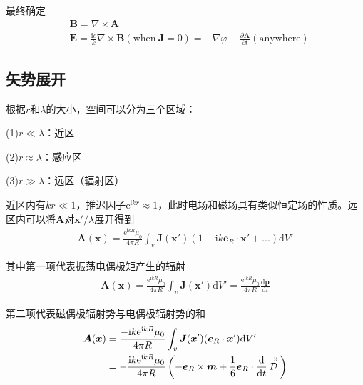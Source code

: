 \documentclass[main.tex]{subfiles}
\begin{document}
最终确定
\begin{align}
    &\boldsymbol{B} = \nabla \times \boldsymbol{A}\\
    &\boldsymbol{E} =  \frac{\mathrm{i}c}{k}\nabla \times \boldsymbol{B} (\mathrm{when}\ \boldsymbol{J} = 0)= -\nabla \varphi - \frac{\partial \boldsymbol{A}}{\partial t}(\mathrm{anywhere})
\end{align}

\subsection{矢势展开}
根据$r$和$\lambda$的大小，空间可以分为三个区域：

(1)$r\ll \lambda$：近区

(2)$r\approx \lambda$：感应区

(3)$r\gg \lambda$：远区（辐射区）

近区内有$kr\ll 1$，推迟因子$\mathrm{e}^{\mathrm{i}kr}\approx 1$，此时电场和磁场具有类似恒定场的性质。远区内可以将$\boldsymbol{A}$对$\boldsymbol{x}'/\lambda$展开得到
\begin{align}
    \boldsymbol{A}(\boldsymbol{x}) = \frac{\mathrm{e}^{\mathrm{i}kR}\mu _0}{4\pi R} \int _{v} \boldsymbol{J}(\boldsymbol{x}')(1-\mathrm{i}k \boldsymbol{e}_R \cdot \boldsymbol{x}'+...)\mathrm{d}V'
\end{align}

其中第一项代表振荡电偶极矩产生的辐射
\begin{align}
    \boldsymbol{A}(\boldsymbol{x}) = \frac {\mathrm{e} ^{\mathrm{i}kR}\mu _0} {4\pi R} \int _{v} \boldsymbol{J} (\boldsymbol{x}') \mathrm{d}V' = \frac {\mathrm{e} ^{\mathrm{i}kR}\mu _0} {4\pi R} \frac{\mathrm{d} \boldsymbol{p}}{\mathrm{d}t}
\end{align}

第二项代表磁偶极辐射势与电偶极辐射势的和
\begin{align}
    \boldsymbol{A}(\boldsymbol{x}) &= \frac {-\mathrm{i}k\mathrm{e} ^{\mathrm{i}kR}\mu _0} {4\pi R} \int _{v} \boldsymbol{J} (\boldsymbol{x}') (\boldsymbol{e}_R \cdot \boldsymbol{x}') \mathrm{d}V'\\
    &= -\frac {\mathrm{i}k\mathrm{e} ^{\mathrm{i}kR}\mu _0} {4\pi R} \left(-\boldsymbol{e}_R \times \boldsymbol{m} + \frac{1}{6} \boldsymbol{e}_R \cdot \frac{\mathrm{d}}{\mathrm{d}t}{\substack{\displaystyle\twoheadrightarrow\atop\displaystyle{\mathcal{D}}\\[0.624em]~}} \right)
\end{align}
\end{document}
